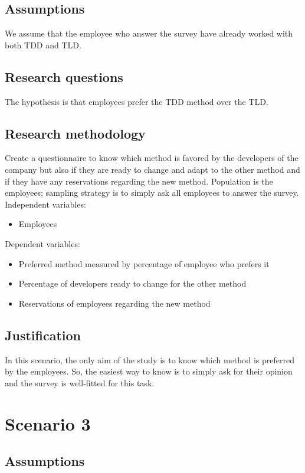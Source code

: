 \documentclass{article}
\begin{document}
\subsection{Assumptions}
We assume that the employee who answer the survey have already worked with both TDD and TLD.

\subsection{Research questions}
The hypothesis is that employees prefer the TDD method over the TLD.

\subsection{Research methodology}
Create a questionnaire to know which method is favored by the developers of the company but also if they are ready to change and adapt to the other method and if they have any reservations regarding the new method.
Population is the employees; sampling strategy is to simply ask all employees to answer the survey. \\
Independent variables:
\begin{itemize}
    \item Employees
\end{itemize}
Dependent variables:
\begin{itemize}
    \item Preferred method measured by percentage of employee who prefers it
    \item Percentage of developers ready to change for the other method
    \item Reservations of employees regarding the new method
\end{itemize}

\subsection{Justification}
In this scenario, the only aim of the study is to know which method is preferred by the employees. So, the easiest way to know is to simply ask for their opinion and the survey is well-fitted for this task.

\section{Scenario 3}
\subsection{Assumptions}
\end{document}
